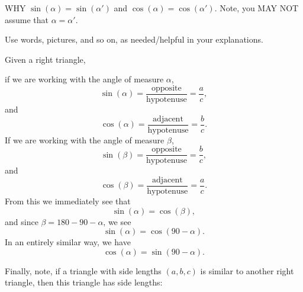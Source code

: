 \documentclass[noauthor,nooutcomes,12pt]{ximera}
\begin{document}
\begin{question}
\begin{enumerate}
\begin{center}
    \end{center}
      WHY $\sin(\alpha) = \sin(\alpha')$ and $\cos(\alpha) =
      \cos(\alpha')$. Note, you MAY NOT assume that $\alpha =
      \alpha'$.
  \end{enumerate}
  Use words, pictures, and so on, as needed/helpful in your
  explanations.
  \begin{freeResponse}
    Given a right triangle,
    \begin{center}
    \end{center}
    if we are working with the angle of measure $\alpha$,
    \[
    \sin(\alpha) = \frac{\text{opposite}}{\text{hypotenuse}} = \frac{a}{c},
    \]
    and
    \[
    \cos(\alpha) = \frac{\text{adjacent}}{\text{hypotenuse}} = \frac{b}{c}.
    \]
    If we are working with the angle of measure $\beta$,
    \[
    \sin(\beta) = \frac{\text{opposite}}{\text{hypotenuse}} = \frac{b}{c},
    \]
    and
    \[
    \cos(\beta) = \frac{\text{adjacent}}{\text{hypotenuse}} = \frac{a}{c}.
    \]
    From this we immediately see that
    \[
    \sin(\alpha) = \cos(\beta),
    \]
    and since $\beta = 180-90-\alpha$, we see
    \[
    \sin(\alpha) = \cos(90-\alpha).
    \]
    In an entirely similar way, we have
    \[
    \cos(\alpha) = \sin(90-\alpha).
    \]

    Finally, note, if a triangle with side lengths $(a,b,c)$ is
    similar to another right triangle, then this triangle has side
    lengths:
          \begin{center}
\end{center}
\end{freeResponse}
\end{question}
\end{document}

